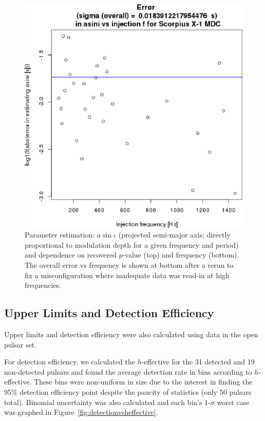 \begin{figure}
\begin{center}
\includegraphics[width=0.5\paperwidth,height=0.35\paperheight]{plots/ErrorAsinivsF-overall.eps}
\caption{Parameter estimation: $a \sin\iota$ (projected semi-major axis; directly proportional to modulation depth for a given frequency and period) and dependence on recovered $p$-value (top) and frequency (bottom). The overall error vs frequency is shown at bottom after a rerun to fix a misconfiguration where inadequate data was read-in at high frequencies.
\label{fig:errorasini}}
\end{center}
\end{figure}


\subsection{Upper Limits and Detection Efficiency}

Upper limits and detection efficiency were also calculated using data in the open pulsar set.

For detection efficiency, we calculated the $h$-effective for the 31 detected and 19 non-detected pulsars and found the average detection rate in bins according to $h$-effective. These bins were non-uniform in size due to the interest in finding the 95\% detection efficiency point despite the paucity of statistics (only 50 pulsars total). 
Binomial uncertainty was also calculated and each bin's 1-$\sigma$ worst case was graphed in Figure~\ref{fig:detectionvsheffective}. 


